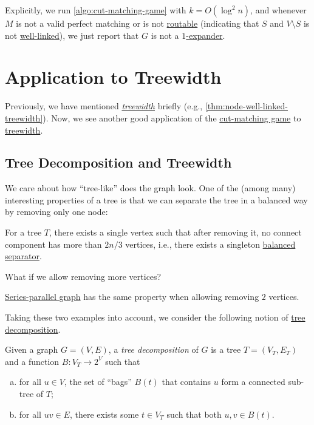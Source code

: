 \begin{note}
	Explicitly, we run \autoref{algo:cut-matching-game} with \(k = O(\log ^2 n)\), and whenever \(M\) is not a valid perfect matching or is not \hyperref[def:routable]{routable} (indicating that \(S\) and \(V\setminus S\) is not \hyperref[def:well-linked]{well-linked}), we just report that \(G\) is not a \hyperref[def:expander]{\(1\)-expander}.
\end{note}

\section{Application to Treewidth}
Previously, we have mentioned \emph{\hyperref[def:treewidth]{treewidth}} briefly (e.g., \autoref{thm:node-well-linked-treewidth}). Now, we see another good application of the \hyperref[def:cut-matching-game]{cut-matching game} to \hyperref[def:treewidth]{treewidth}.

\subsection{Tree Decomposition and Treewidth}
We care about how ``tree-like'' does the graph look. One of the (among many) interesting properties of a tree is that we can separate the tree in a balanced way by removing only one node:

\begin{eg}[Tree]
	For a tree \(T\), there exists a single vertex such that after removing it, no connect component has more than \(2 n/ 3\) vertices, i.e., there exists a singleton \hyperref[def:balanced-separator]{balanced separator}.
\end{eg}

What if we allow removing more vertices?

\begin{eg}
	\href{https://en.wikipedia.org/wiki/Series%E2%80%93parallel_graph}{Series-parallel graph} has the same property when allowing removing \(2\) vertices.
\end{eg}

Taking these two examples into account, we consider the following notion of \hyperref[def:tree-decomposition]{tree decomposition}.

\begin{definition}\label{def:tree-decomposition}
	Given a graph \(G = (V, E)\), a \emph{tree decomposition} of \(G\) is a tree \(T = (V_T, E_T)\) and a function \(B \colon V_T \to 2^V\) such that
	\begin{enumerate}[(a)]
		\item for all \(u \in V\), the set of ``bags'' \(B(t)\) that contains \(u\) form a connected sub-tree of \(T\);
		\item for all \(uv \in E\), there exists some \(t \in V_T\) such that both \(u, v \in B(t)\).
	\end{enumerate}
\end{definition}

